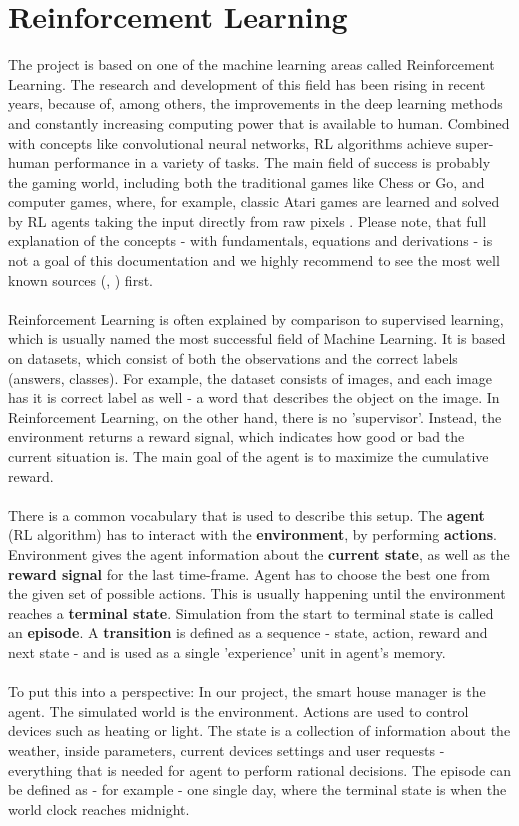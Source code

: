 \documentclass{article}
\begin{document}
\section{Reinforcement Learning}
The project is based on one of the machine learning areas called Reinforcement Learning. The research and development of this field has been rising in recent years, because of, among others, the improvements in the deep learning methods and constantly increasing computing power that is available to human. Combined with concepts like convolutional neural networks, RL algorithms achieve super-human performance in a variety of tasks. The main field of success is probably the gaming world, including both the traditional games like Chess or Go, and computer games, where, for example, classic Atari games are learned and solved by RL agents taking the input directly from raw pixels \cite{dqn_paper}. Please note, that full explanation of the concepts - with fundamentals, equations and derivations - is not a goal of this documentation and we highly recommend to see the most well known sources (\cite{suttonBook}, \cite{silverCourse}) first.
\\\\
Reinforcement Learning is often explained by comparison to supervised learning, which is usually named the most successful field of Machine Learning. It is based on datasets, which consist of both the observations and the correct labels (answers, classes). For example, the dataset consists of images, and each image has it is correct label as well - a word that describes the object on the image. In Reinforcement Learning, on the other hand, there is no 'supervisor'. Instead, the environment returns a reward signal, which indicates how good or bad the current situation is. The main goal of the agent is to maximize the cumulative reward.
\\\\
There is a common vocabulary that is used to describe this setup. The \textbf{agent} (RL algorithm) has to interact with the \textbf{environment}, by performing \textbf{actions}. Environment gives the agent information about the \textbf{current state}, as well as the \textbf{reward signal} for the last time-frame. Agent has to choose the best one from the given set of possible actions. This is usually happening until the environment reaches a \textbf{terminal state}. Simulation from the start to terminal state is called an \textbf{episode}. A \textbf{transition} is defined as a sequence - state, action, reward and next state - and is used as a single 'experience' unit in agent's memory. 
\\\\
To put this into a perspective: In our project, the smart house manager is the agent. The simulated world is the environment. Actions are used to control devices such as heating or light. The state is a collection of information about the weather, inside parameters, current devices settings and user requests - everything that is needed for agent to perform rational decisions. The episode can be defined as - for example - one single day, where the terminal state is when the world clock reaches midnight.
\end{document}
